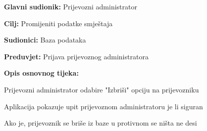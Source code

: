 			\noindent {}
			\begin{packed_item}
				
				\item \textbf{Glavni sudionik: }Prijevozni administrator
				\item  \textbf{Cilj:} Promijeniti podatke smještaja
				\item  \textbf{Sudionici:} Baza podataka
				\item  \textbf{Preduvjet:} Prijava prijevoznog administratora
				\item  \textbf{Opis osnovnog tijeka:}
				
				\item[] \begin{packed_enum}
					
					\item Prijevozni administrator odabire "Izbriši" opciju na prijevozniku
					\item Aplikacija pokazuje upit prijevoznom administratoru je li siguran
					\item Ako je, prijevoznik se briše iz baze u protivnom se ništa ne desi
				\end{packed_enum}
				
			\end{packed_item}
			
